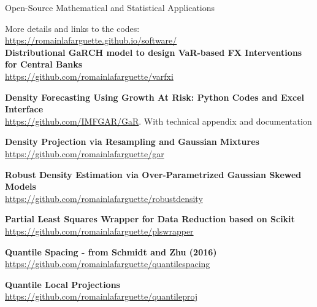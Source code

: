 \documentclass[usegeometry, 10pt, a4paper]{cv} %
\newcommand{\activite}[1]{\textbf{#1}\ }
\begin{document}
\begin{rubriquetableau}[0.95\textwidth]{Open-Source Mathematical and Statistical Applications}\\
  \vspace{-0.5cm}
  
More details and links to the codes: \url{https://romainlafarguette.github.io/software/}\\

\small
\activite{Distributional GaRCH model to design VaR-based FX Interventions for Central Banks} \\
\hspace{0.6cm} \small{\url{https://github.com/romainlafarguette/varfxi}}
\vspace{0.4cm} 

\small
\activite{Density Forecasting Using Growth At Risk: Python Codes and Excel Interface} \\
\hspace{0.6cm} \small{\url{https://github.com/IMFGAR/GaR}. With technical
  appendix and documentation}
\vspace{0.4cm} 

\small
\activite{Density Projection via Resampling and Gaussian Mixtures} \\
\hspace{0.6cm} \small{\url{https://github.com/romainlafarguette/gar}}
\vspace{0.4cm} 

\small
\activite{Robust Density Estimation via Over-Parametrized Gaussian Skewed Models} \\
\hspace{0.6cm} \small{\url{https://github.com/romainlafarguette/robustdensity}}
\vspace{0.4cm} 

\small
\activite{Partial Least Squares Wrapper for Data Reduction based on Scikit} \\
\hspace{0.6cm} \small{\url{https://github.com/romainlafarguette/plswrapper}}
\vspace{0.4cm} 

\small
\activite{Quantile Spacing - from Schmidt and Zhu (2016)} \\
\hspace{0.6cm} \small{\url{https://github.com/romainlafarguette/quantilespacing}}
\vspace{0.4cm} 

\small
\activite{Quantile Local Projections} \\
\hspace{0.6cm} \small{\url{https://github.com/romainlafarguette/quantileproj}}
\vspace{0.4cm} 


\end{rubriquetableau}
\end{document}
